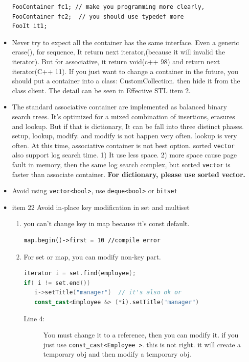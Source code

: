 \documentclass[a4paper,11pt,twoside]{book}
\begin{document}
\begin{itemize}
\begin{lstlisting}[numbers=none]
FooContainer fc1; // make you programming more clearly,
FooContainer fc2;  // you should use typedef more
FooIt it1;
\end{lstlisting}

\item Never try to expect all the container has the same interface. Even a generic erase(), for sequence, It return next iterator,(because it will invalid the iterator).   But for associative, it return void(c++ 98) and return next iterator(C++ 11). If you just want to change a container in the future, you should put a container into a class: CustomCollection. then hide it from the class client. The detail can be seen in Effective STL item 2.

\item The standard associative container are implemented as balanced binary search trees.  It's optimized for a mixed combination of insertions, erasures and lookup.  But if that is dictionary, It can be fall into three distinct phases. setup, lookup, modify. and modify is not happen very often. lookup is very often. At this time, associative container is not best option. sorted \texttt{vector} also support log search time.  1) It use less space. 2) more space cause page fault in memory, then the same log search complex, but sorted \texttt{vector} is faster than associate container.\textbf{ For dictionary, please use sorted vector.}


\item Avoid using \texttt{vector<bool>}, use \texttt{deque<bool>} or \texttt{bitset}


\item item 22 Avoid in-place key modification in set and multiset
\begin{enumerate}
   \item you can't change key in map because it's const default.
\begin{lstlisting}[numbers=none]
map.begin()->first = 10 //compile error
\end{lstlisting}

   \item For set or map, you can modify non-key part.
\begin{lstlisting}[frame=single, language=c++]
iterator i = set.find(employee);
if( i != set.end())
   i->setTitle("manager")  // it's also ok or
   const_cast<Employee &> (*i).setTitle("manager")
\end{lstlisting}
\begin{description}
	\item[Line 4:]  You must change it to a reference, then you can modify it. if you just use \texttt{const\_cast<Employee >}. this is not right. it will create a temporary obj and then modify a temporary obj.
\end{description}


\end{enumerate}
\end{itemize}
\end{document}
